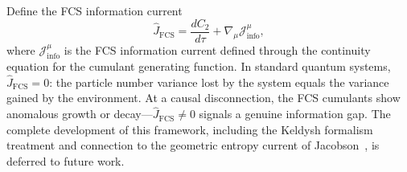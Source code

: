 \documentclass[aps,pra,preprint,groupedaddress,amsmath,amssymb,floatfix]{revtex4-2}
\begin{document}
Define the FCS information current
\begin{equation}
\hat{J}_{\text{FCS}} = \frac{dC_2}{d\tau} + \nabla_\mu \mathcal{J}^\mu_{\text{info}},
\end{equation}
where $\mathcal{J}^\mu_{\text{info}}$ is the FCS information current defined through the continuity equation for the cumulant generating function. In standard quantum systems, $\hat{J}_{\text{FCS}} = 0$: the particle number variance lost by the system equals the variance gained by the environment. At a causal disconnection, the FCS cumulants show anomalous growth or decay---$\hat{J}_{\text{FCS}} \neq 0$ signals a genuine information gap. The complete development of this framework, including the Keldysh formalism treatment and connection to the geometric entropy current of Jacobson~\cite{jacobson1995}, is deferred to future work.

\begin{acknowledgments}
[To be completed.]
\end{acknowledgments}


\end{document}
